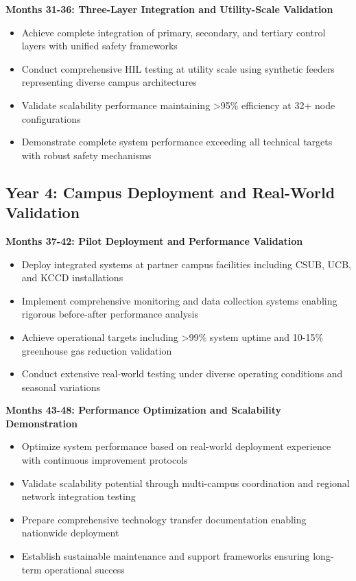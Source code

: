 \documentclass[12pt]{article}
\begin{document}
\textbf{Months 31-36: Three-Layer Integration and Utility-Scale Validation}
\begin{itemize}
\item Achieve complete integration of primary, secondary, and tertiary control layers with unified safety frameworks
\item Conduct comprehensive HIL testing at utility scale using synthetic feeders representing diverse campus architectures
\item Validate scalability performance maintaining >95\% efficiency at 32+ node configurations
\item Demonstrate complete system performance exceeding all technical targets with robust safety mechanisms
\end{itemize}

\subsection{Year 4: Campus Deployment and Real-World Validation}

\textbf{Months 37-42: Pilot Deployment and Performance Validation}
\begin{itemize}
\item Deploy integrated systems at partner campus facilities including CSUB, UCB, and KCCD installations
\item Implement comprehensive monitoring and data collection systems enabling rigorous before-after performance analysis
\item Achieve operational targets including >99\% system uptime and 10-15\% greenhouse gas reduction validation
\item Conduct extensive real-world testing under diverse operating conditions and seasonal variations
\end{itemize}

\textbf{Months 43-48: Performance Optimization and Scalability Demonstration}
\begin{itemize}
\item Optimize system performance based on real-world deployment experience with continuous improvement protocols
\item Validate scalability potential through multi-campus coordination and regional network integration testing
\item Prepare comprehensive technology transfer documentation enabling nationwide deployment
\item Establish sustainable maintenance and support frameworks ensuring long-term operational success
\end{itemize}
\end{document}

